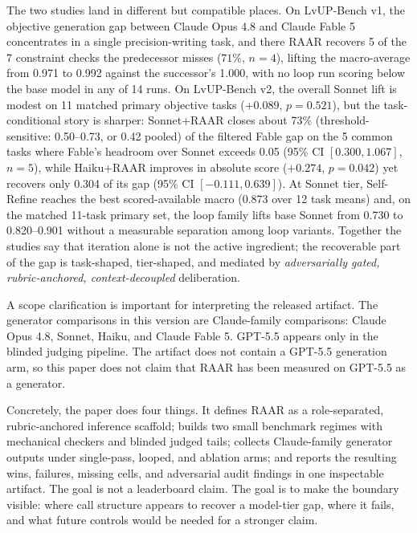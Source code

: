 \documentclass[journal]{IEEEtran}
\newcommand{\method}{RAAR}
\newcommand{\bench}{LvUP-Bench}
\newcommand{\opus}{Claude Opus 4.8}
\newcommand{\fable}{Claude Fable 5}
\begin{document}
The two studies land in different but compatible places. On \bench{} v1,
the objective generation gap between \opus{} and \fable{} concentrates in
a single precision-writing task, and there \method{} recovers 5 of the 7
constraint checks the predecessor misses ($71\%$, $n{=}4$), lifting the
macro-average from 0.971 to 0.992 against the successor's 1.000, with no
loop run scoring below the base model in any of 14 runs. On \bench{} v2,
the overall Sonnet lift is modest on 11 matched primary objective tasks
($+0.089$, $p{=}0.521$), but the task-conditional story is sharper:
Sonnet+\method{} closes about 73\% (threshold-sensitive: 0.50--0.73,
or 0.42 pooled) of the filtered Fable gap on the 5 common tasks where
Fable's headroom over Sonnet exceeds 0.05 (95\% CI $[0.300, 1.067]$, $n{=}5$), while Haiku+\method{} improves in absolute
score ($+0.274$, $p{=}0.042$) yet recovers only 0.304 of its gap (95\% CI
$[-0.111, 0.639]$). At Sonnet tier, Self-Refine reaches the best
scored-available macro (0.873 over 12 task means) and, on the matched
11-task primary set, the loop family lifts base Sonnet from 0.730 to
0.820--0.901 without a measurable separation among loop variants. Together
the studies say that
iteration alone is not the active ingredient; the recoverable part of the
gap is task-shaped, tier-shaped, and mediated by
\emph{adversarially gated, rubric-anchored, context-decoupled}
deliberation.

A scope clarification is important for interpreting the released artifact.
The generator comparisons in this version are Claude-family comparisons:
\opus{}, Sonnet, Haiku, and \fable{}. GPT-5.5 appears only in the blinded
judging pipeline. The artifact does not contain a GPT-5.5 generation arm, so
this paper does not claim that \method{} has been measured on GPT-5.5 as a
generator.

Concretely, the paper does four things. It defines \method{} as a
role-separated, rubric-anchored inference scaffold; builds two small
benchmark regimes with mechanical checkers and blinded judged tails; collects
Claude-family generator outputs under single-pass, looped, and ablation arms;
and reports the resulting wins, failures, missing cells, and adversarial audit
findings in one inspectable artifact. The goal is not a leaderboard claim.
The goal is to make the boundary visible: where call structure appears to
recover a model-tier gap, where it fails, and what future controls would be
needed for a stronger claim.
\end{document}
